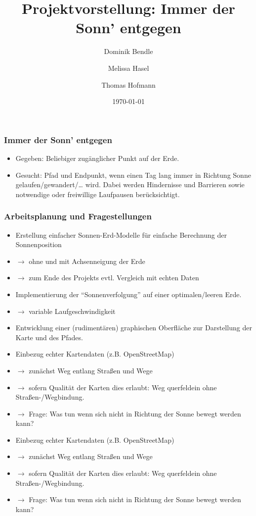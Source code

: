 \documentclass[aspectratio=43]{beamer}
\title{Projektvorstellung: Immer der Sonn' entgegen}
\author{Dominik Bendle \and Melissa Hasel \and Thomas Hofmann}
\date{\today}
\institute{TU Kaiserslautern}
\begin{document}
\begin{frame}[plain]


\end{frame}

\begin{frame}
    \frametitle{Immer der Sonn' entgegen}
    \begin{itemize}
        \item Gegeben: Beliebiger zugänglicher Punkt auf der Erde.
        \item Gesucht: Pfad und Endpunkt, wenn einen Tag lang immer in Richtung Sonne
            gelaufen/gewandert/\dots{} wird. Dabei werden Hindernisse und Barrieren sowie
            notwendige oder freiwillige Laufpausen berücksichtigt.
    \end{itemize}
\end{frame}

\begin{frame}[plain]
    \frametitle{Arbeitsplanung und Fragestellungen}
    \begin{itemize}
        \item Erstellung einfacher Sonnen-Erd-Modelle für einfache Berechnung der
            Sonnenposition
        \item[] $\rightarrow$ ohne und mit Achsenneigung der Erde
        \item[] $\rightarrow$ zum Ende des Projekts evtl. Vergleich mit echten Daten
        \item Implementierung der \enquote{Sonnenverfolgung} auf einer optimalen/leeren Erde.
        \item[] $\rightarrow$ variable Laufgeschwindigkeit
        \item Entwicklung einer (rudimentären) graphischen Oberfläche zur Darstellung der
            Karte und des Pfades.
        \item Einbezug echter Kartendaten (z.B. OpenStreetMap)
        \item[] $\rightarrow$ zunächst Weg entlang Straßen und Wege
        \item[] $\rightarrow$ sofern Qualität der Karten dies erlaubt: Weg querfeldein
            ohne Straßen-/Wegbindung.
        \item[] $\rightarrow$ Frage: Was tun wenn sich nicht in Richtung der Sonne bewegt
            werden kann?
    \end{itemize}
\end{frame}

\begin{frame}
    \begin{itemize}
        \item Einbezug echter Kartendaten (z.B. OpenStreetMap)
        \item[] $\rightarrow$ zunächst Weg entlang Straßen und Wege
        \item[] $\rightarrow$ sofern Qualität der Karten dies erlaubt: Weg querfeldein
            ohne Straßen-/Wegbindung.
        \item[] $\rightarrow$ Frage: Was tun wenn sich nicht in Richtung der Sonne bewegt
            werden kann?
    \end{itemize}
\end{frame}
\end{document}
